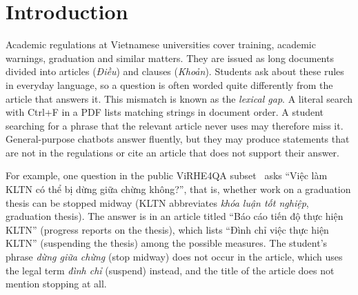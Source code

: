 \section{Introduction}
\label{sec:intro}

Academic regulations at Vietnamese universities cover training, academic
warnings, graduation and similar matters. They are issued as long documents
divided into articles (\emph{Điều}) and clauses (\emph{Khoản}). Students ask
about these rules in everyday language, so a question is often worded quite
differently from the article that answers it. This mismatch is known as the
\emph{lexical gap}. A literal search with Ctrl+F in a PDF lists matching
strings in document order. A student searching for a phrase that the relevant
article never uses may therefore miss it.
General-purpose chatbots answer fluently, but they may produce statements that
are not in the regulations or cite an article that does not support their answer.

For example, one question in the public ViRHE4QA
subset~\cite{do2024r2gqaretrieverreadergeneratorquestionanswering,nguyen-quan-2026-works}
asks ``Việc làm KLTN có thể bị dừng giữa chừng không?'', that is, whether work
on a graduation thesis can be stopped midway (KLTN abbreviates \emph{khóa luận
tốt nghiệp}, graduation thesis). The answer is in an article titled ``Báo cáo
tiến độ thực hiện KLTN'' (progress reports on the thesis), which lists ``Đình
chỉ việc thực hiện KLTN'' (suspending the thesis) among the possible measures. The
student's phrase \emph{dừng giữa chừng} (stop midway) does not occur in the
article, which uses the legal term \emph{đình chỉ} (suspend) instead, and the
title of the article does not mention stopping at all.

